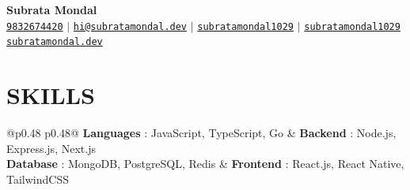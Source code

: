 \documentclass[letterpaper,10pt]{article}
\begin{document}
\begin{center}
    \textbf{\LARGE Subrata Mondal} \\ \vspace{4pt}
    \small{
    \hspace{1pt} \faPhone \hspace{2pt} \href{tel:+919832674420}
    {\texttt{9832674420}} \hspace{1pt} $|$ 
    \hspace{1pt} \faEnvelope \hspace{2pt} \href{mailto:hi@subratamondal.dev}{\texttt{hi@subratamondal.dev}} \hspace{1pt} $|$ 
    \hspace{1pt} \faGithub \hspace{2pt} \href{https://github.com/subratamondal1029}{\texttt{subratamondal1029}} \hspace{1pt} $|$
    \hspace{1pt} \faLinkedin \hspace{2pt} \href{https://www.linkedin.com/in/subratamondal1029}{\texttt{subratamondal1029}} \hspace{1pt}
    \\ \vspace{2pt}
    \faGlobe \hspace{2pt} \href{https://subratamondal.dev}{\texttt{subratamondal.dev}} \hspace{1pt}
    }
    \\ \vspace{-3pt}
\end{center}

\section{SKILLS}
\begin{itemize}[leftmargin=0in, label={}]
    \small{\item{
    \begin{tabular}{@{}p{0.48\linewidth} p{0.48\linewidth}@{}}
     \textbf{Languages} {: JavaScript, TypeScript, Go} &
     \textbf{Backend}   {: Node.js, Express.js, Next.js} \\[4pt]
     \textbf{Database}  {: MongoDB, PostgreSQL, Redis} &
     \textbf{Frontend}  {: React.js, React Native, TailwindCSS} \\[4pt]
    \end{tabular}
    }}
\end{itemize}
\end{document}
